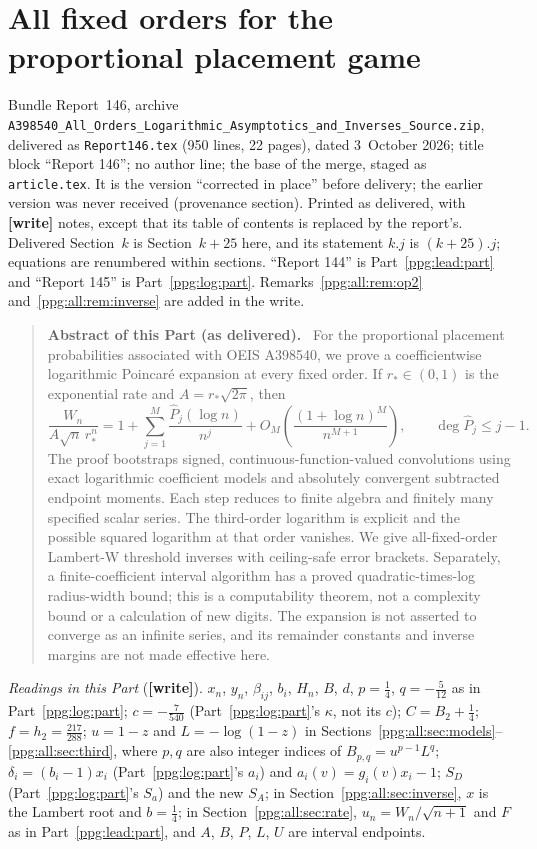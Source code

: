 \documentclass[11pt,letterpaper]{article}
\theoremstyle{remark}\newtheorem{remark}[theorem]{Remark}
\numberwithin{equation}{section}
\newcommand{\file}[1]{\nolinkurl{#1}}
\newcommand{\wtag}{\textup{\textbf{[write]}}}
\newenvironment{partabstract}{\begin{quote}\small\noindent\textbf{Abstract of this Part (as delivered).}\ }{\end{quote}}
\newcommand{\partsource}[1]{\par\noindent\begin{minipage}{\textwidth}\small #1\end{minipage}\par\medskip}
\begin{document}
\part{All fixed orders for the proportional placement game}\label{ppg:all:part}
\partsource{Bundle Report~146, archive \file{A398540_All_Orders_Logarithmic_Asymptotics_and_Inverses_Source.zip}, delivered as \file{Report146.tex} (950 lines, 22 pages), dated 3~October 2026; title block ``Report 146''; no author line; the base of the merge, staged as \file{article.tex}. It is the version ``corrected in place'' before delivery; the earlier version was never received (provenance section). Printed as delivered, with \textbf{[write]} notes, except that its table of contents is replaced by the report's. Delivered Section~$k$ is Section~$k+25$ here, and its statement $k.j$ is $(k+25).j$; equations are renumbered within sections. ``Report 144'' is Part~\ref{ppg:lead:part} and ``Report 145'' is Part~\ref{ppg:log:part}. Remarks~\ref{ppg:all:rem:op2} and~\ref{ppg:all:rem:inverse} are added in the write.}
\begin{partabstract}
For the proportional placement probabilities associated with OEIS A398540, we prove a coefficientwise logarithmic Poincar\'e expansion at every fixed order. If $r_*\in(0,1)$ is the exponential rate and $A=r_*\sqrt{2\pi}$, then
\[
\frac{W_n}{A\sqrt n\,r_*^n}
 =1+\sum_{j=1}^M\frac{\widehat P_j(\log n)}{n^j}
   +O_M\!\left(\frac{(1+\log n)^M}{n^{M+1}}\right),
\qquad \deg\widehat P_j\le j-1.
\]
The proof bootstraps signed, continuous-function-valued convolutions using exact logarithmic coefficient models and absolutely convergent subtracted endpoint moments. Each step reduces to finite algebra and finitely many specified scalar series. The third-order logarithm is explicit and the possible squared logarithm at that order vanishes. We give all-fixed-order Lambert-W threshold inverses with ceiling-safe error brackets. Separately, a finite-coefficient interval algorithm has a proved quadratic-times-log radius-width bound; this is a computability theorem, not a complexity bound or a calculation of new digits. The expansion is not asserted to converge as an infinite series, and its remainder constants and inverse margins are not made effective here.
\end{partabstract}
{\small\emph{Readings in this Part} (\wtag). $x_n$, $y_n$, $\beta_{ij}$, $b_i$, $H_n$, $B$, $d$, $p=\frac14$, $q=-\frac5{12}$ as in Part~\ref{ppg:log:part}; $c=-\frac7{540}$ (Part~\ref{ppg:log:part}'s $\kappa$, not its $c$); $C=B_2+\frac14$; $f=h_2=\frac{217}{288}$; $u=1-z$ and $L=-\log(1-z)$ in Sections~\ref{ppg:all:sec:models}--\ref{ppg:all:sec:third}, where $p,q$ are also integer indices of $B_{p,q}=u^{p-1}L^q$; $\delta_i=(b_i-1)x_i$ (Part~\ref{ppg:log:part}'s $a_i$) and $a_i(v)=g_i(v)x_i-1$; $S_D$ (Part~\ref{ppg:log:part}'s $S_a$) and the new $S_A$; in Section~\ref{ppg:all:sec:inverse}, $x$ is the Lambert root and $b=\frac14$; in Section~\ref{ppg:all:sec:rate}, $u_n=W_n/\sqrt{n+1}$ and $F$ as in Part~\ref{ppg:lead:part}, and $A$, $B$, $P$, $L$, $U$ are interval endpoints.\par}
\end{document}
